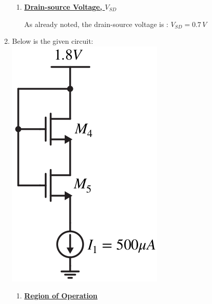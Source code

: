 \documentclass[12pt, fleqn]{article}
\begin{document}
\begin{enumerate}[label=(\alph*)]
{\begin{enumerate}[label=(\roman*)]
{        \newpage
        With reference to \textit{Eq.~\ref{eq:mosfet_ids_pmos_tri}}:
        \begin{align*}
            I_{SD,tri} &=\left(\frac{W}{L}\right) \mu_p\,C_{ox}
                            \left(V_{SG} - \left|V_{T_p}\right| - \frac{V_{SD}}{2}\right) V_{SD}\\[0.25cm]
            &=\left(20\right) 200 \mu A/V^2 \left(1.3\,V - \frac{0.7\,V}{2}\right) 0.7\,V\\[0.25cm]
            &= 4000 \mu A/V^2 \left(0.95\,V\right) 0.7\,V\\[0.25cm]
            &= 0.00266\,A
        \end{align*}
        \vspace{0.15cm}
        $\boxed{\therefore\quad{\text{This device has a drain current of : }I_{SD} = 2.66\,mA}}$
        }
        \vspace{0.25cm}
        \item
        {
        \underline{\textbf{Drain-source Voltage, $V_{SD}$}}
        
        \vspace{0.15cm}
        As already noted, the drain-source voltage is : $\boxed{V_{SD} = 0.7\,V}$
        }
    \end{enumerate}
    }
    \newpage\noindent
    \item
    {
    Below is the given circuit:\\
    \includegraphics[scale=0.55, center]{p1d.png}\\
    \begin{enumerate}[label=(\roman*)]
        \item
        {
        \underline{\textbf{Region of Operation}}
        
}
\end{enumerate}}
\end{enumerate}
\end{document}
